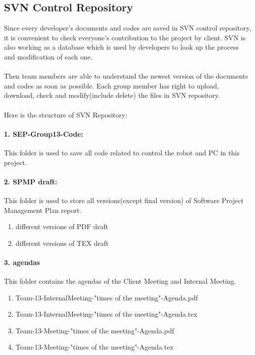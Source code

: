 \documentclass[11pt, a4paper]{report}
\begin{document}
\subsection{SVN Control Repository}
Since every developer's documents and codes are saved in SVN control repository, it is convenient to check everyone's contribution to the project by client. SVN is also working as a database which is used by developers to look up the process and modification of each one.\\ \\
Then team members are able to understand the newest version of the documents and codes as soon as possible. Each group member has right to upload, download, check and modify(include delete) the files in SVN repository.\\ \\
Here is the structure of SVN Repository:
\paragraph{1. SEP-Group13-Code:}
This folder is used to save all code related to control the robot and PC  in this project. 
\paragraph{2. SPMP draft:}
This folder is used to store all versions(except final version) of Software Project Management Plan report.

\begin{enumerate}
 	\item different versions of PDF draft
 	\item different versions of TEX draft 
\end{enumerate}

\paragraph{3. agendas}
This folder contains the agendas of the Client Meeting and Internal Meeting.

\begin{enumerate}
	\item Team-13-InternalMeeting-"times of the meeting"-Agenda.pdf
	\item Team-13-InternalMeeting-"times of the meeting"-Agenda.tex
	\item Team-13-Meeting-"times of the meeting"-Agenda.pdf
	\item Team-13-Meeting-"times of the meeting"-Agenda.tex
\end{enumerate}
\end{document}
